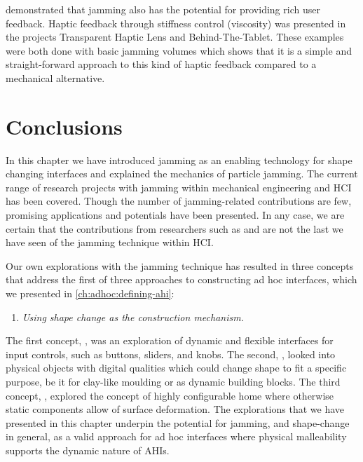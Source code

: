 \citet{follmer2012jamming} demonstrated that jamming also has the potential for providing rich user feedback. 
Haptic feedback through stiffness control (viscosity) was presented in the projects Transparent Haptic Lens and Behind-The-Tablet.
These examples were both done with basic jamming volumes which shows that it is a simple and straight-forward approach to this kind of haptic feedback compared to a mechanical alternative.

\section{Conclusions}
In this chapter we have introduced jamming as an enabling technology for shape changing interfaces and explained the mechanics of particle jamming.
The current range of research projects with jamming within mechanical engineering and HCI has been covered.
Though the number of jamming-related contributions are few, promising applications and potentials have been presented.
In any case, we are certain that the contributions from researchers such as \citet{follmer2012jamming} and \citet{matoba2012claytricsurface} are not the last we have seen of the jamming technique within HCI.

Our own explorations with the jamming technique has resulted in three concepts that address the first of three approaches to constructing ad hoc interfaces, which we presented in \autoref{ch:adhoc:defining-ahi}:
\begin{enumerate}
	\item{\emph{Using shape change as the construction mechanism.}}
\end{enumerate}
The first concept, \emph{}, was an exploration of dynamic and flexible interfaces for input controls, such as buttons, sliders, and knobs.
The second, \emph{}, looked into physical objects with digital qualities which could change shape to fit a specific purpose, be it for clay-like moulding or as dynamic building blocks.
The third concept, \emph{}, explored the concept of highly configurable home where otherwise static components allow of surface deformation.
The explorations that we have presented in this chapter underpin the potential for jamming, and shape-change in general, as a valid approach for ad hoc interfaces where physical malleability supports the dynamic nature of AHIs.

